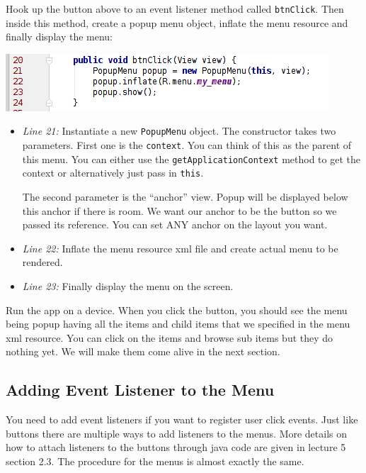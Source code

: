Hook up the button above to an event listener method called \texttt{btnClick}. Then inside this method, create a popup menu object, inflate the menu resource and finally display the menu:

\begin{center}
	\includegraphics[scale=0.4]{chapters/ch07/images/42}
\end{center}

\begin{itemize}
	\item \textit{Line 21:} Instantiate a new \texttt{PopupMenu} object. The constructor takes two parameters. First one is the \texttt{context}. You can think of this as the parent of this menu. You can either use the \texttt{getApplicationContext} method to get the context or alternatively just pass in \texttt{this}.
	
	The second parameter is the ``anchor'' view. Popup will be displayed below this anchor if there is room. We want our anchor to be the button so we passed its reference. You can set ANY anchor on the layout you want.
	
	\item \textit{Line 22:} Inflate the menu resource xml file and create actual menu to be rendered.
	
	\item \textit{Line 23:} Finally display the menu on the screen.
\end{itemize}

Run the app on a device. When you click the button, you should see the menu being popup having all the items and child items that we specified in the menu xml resource. You can click on the items and browse sub items but they do nothing yet. We will make them come alive in the next section.

\subsection{Adding Event Listener to the Menu}
\label{PMAB:addEventListenerToMenu}
You need to add event listeners if you want to register user click events. Just like buttons there are multiple ways to add listeners to the menus. More details on how to attach listeners to the buttons through java code are given in lecture 5 section 2.3. The procedure for the menus is almost exactly the same. \\

